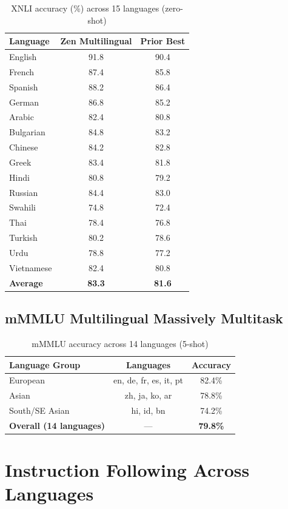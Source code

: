 \documentclass[11pt,a4paper]{article}
\begin{document}
\begin{table}[H]
\centering
\caption{XNLI accuracy (\%) across 15 languages (zero-shot)}
\label{tab:xnli}
\begin{tabular}{lcc}
\toprule
Language & Zen Multilingual & Prior Best \\
\midrule
English & 91.8 & 90.4 \\
French & 87.4 & 85.8 \\
Spanish & 88.2 & 86.4 \\
German & 86.8 & 85.2 \\
Arabic & 82.4 & 80.8 \\
Bulgarian & 84.8 & 83.2 \\
Chinese & 84.2 & 82.8 \\
Greek & 83.4 & 81.8 \\
Hindi & 80.8 & 79.2 \\
Russian & 84.4 & 83.0 \\
Swahili & 74.8 & 72.4 \\
Thai & 78.4 & 76.8 \\
Turkish & 80.2 & 78.6 \\
Urdu & 78.8 & 77.2 \\
Vietnamese & 82.4 & 80.8 \\
\midrule
\textbf{Average} & \textbf{83.3} & \textbf{81.6} \\
\bottomrule
\end{tabular}
\end{table}

\subsection{mMMLU Multilingual Massively Multitask}

\begin{table}[H]
\centering
\caption{mMMLU accuracy across 14 languages (5-shot)}
\label{tab:mmmlu}
\begin{tabular}{lcc}
\toprule
Language Group & Languages & Accuracy \\
\midrule
European & en, de, fr, es, it, pt & 82.4\% \\
Asian & zh, ja, ko, ar & 78.8\% \\
South/SE Asian & hi, id, bn & 74.2\% \\
\midrule
\textbf{Overall (14 languages)} & — & \textbf{79.8\%} \\
\bottomrule
\end{tabular}
\end{table}

\section{Instruction Following Across Languages}
\end{document}
